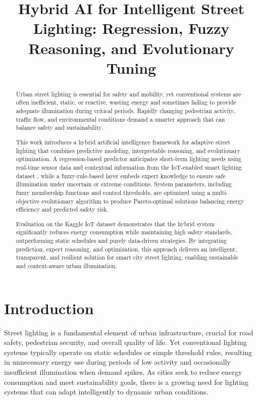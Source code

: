 \documentclass[conference]{IEEEtran}
\title{Hybrid AI for Intelligent Street Lighting: Regression, Fuzzy Reasoning, and Evolutionary Tuning}
\author{
\IEEEauthorblockN{(Everyone has done equal amount of work) \\ Michał Mazurek, Marcin Basisty, Łukasz Święch, Byeongjun Min}
\IEEEauthorblockA{
Faculty of Physics and Applied Computer Science\\
AGH University of Science\\
Krakow, Poland\\
}
}
\begin{document}
\maketitle
\begin{abstract}
Urban street lighting is essential for safety and mobility, yet conventional systems are often inefficient, static, or reactive, wasting energy and sometimes failing to provide adequate illumination during critical periods. Rapidly changing pedestrian activity, traffic flow, and environmental conditions demand a smarter approach that can balance safety and sustainability.

This work introduces a hybrid artificial intelligence framework for adaptive street lighting that combines predictive modeling, interpretable reasoning, and evolutionary optimization. A regression-based predictor anticipates short-term lighting needs using real-time sensor data and contextual information from the IoT-enabled smart lighting dataset \cite{smartlighting_dataset}, while a fuzzy-rule-based layer embeds expert knowledge to ensure safe illumination under uncertain or extreme conditions. System parameters, including fuzzy membership functions and control thresholds, are optimized using a multi-objective evolutionary algorithm to produce Pareto-optimal solutions balancing energy efficiency and predicted safety risk.

Evaluation on the Kaggle IoT dataset demonstrates that the hybrid system significantly reduces energy consumption while maintaining high safety standards, outperforming static schedules and purely data-driven strategies. By integrating prediction, expert reasoning, and optimization, this approach delivers an intelligent, transparent, and resilient solution for smart city street lighting, enabling sustainable and context-aware urban illumination.
\end{abstract}

\section{Introduction}

Street lighting is a fundamental element of urban infrastructure, crucial for road safety, pedestrian security, and overall quality of life. Yet conventional lighting systems typically operate on static schedules or simple threshold rules, resulting in unnecessary energy use during periods of low activity and occasionally insufficient illumination when demand spikes. As cities seek to reduce energy consumption and meet sustainability goals, there is a growing need for lighting systems that can adapt intelligently to dynamic urban conditions.
\end{document}
